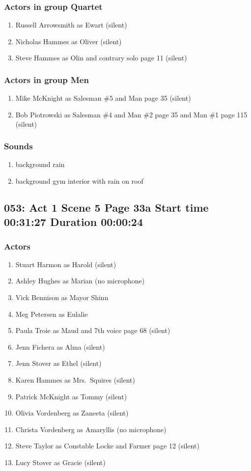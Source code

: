 \subsubsection{Actors in group Quartet}
\begin{enumerate}
\item Russell Arrowsmith as Ewart (silent)
\item Nicholas Hammes as Oliver (silent)
\item Steve Hammes as Olin and contrary solo page 11 (silent)
\end{enumerate}
\subsubsection{Actors in group Men}
\begin{enumerate}
\item Mike McKnight as Salesman \#5 and Man page 35 (silent)
\item Bob Piotrowski as Salesman \#4 and Man \#2 page 35 and Man \#1 page 115 (silent)
\end{enumerate}

\subsubsection{Sounds}
\begin{enumerate}
\item background rain
\item background gym interior with rain on roof
\end{enumerate}
\subsection{053: Act 1 Scene 5 Page 33a Start time 00:31:27 Duration 00:00:24}

\subsubsection{Actors}
\begin{enumerate}
\item Stuart Harmon as Harold (silent)
\item Ashley Hughes as Marian (no microphone)
\item Vick Bennison as Mayor Shinn
\item Meg Petersen as Eulalie
\item Paula Troie as Maud and 7th voice page 68 (silent)
\item Jenn Fichera as Alma (silent)
\item Jenn Stover as Ethel (silent)
\item Karen Hammes as Mrs.~Squires (silent)
\item Patrick McKnight as Tommy (silent)
\item Olivia Vordenberg as Zaneeta (silent)
\item Christa Vordenberg as Amaryllis (no microphone)
\item Steve Taylor as Constable Locke and Farmer page 12 (silent)
\item Lucy Stover as Gracie (silent)
\end{enumerate}
